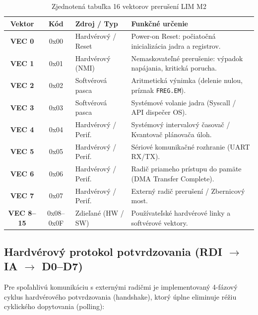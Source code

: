 \documentclass[11pt,a4paper]{article}
\newcommand{\reg}[1]{\texttt{#1}}
\begin{document}
\begin{table}[h]
\centering
\caption{Zjednotená tabuľka 16 vektorov prerušení LIM M2}
\label{tab:vectors}
\begin{tabularx}{\textwidth}{>{\bfseries}c >{\ttfamily}c p{32mm}X}
\toprule
Vektor & Kód & Zdroj / Typ & Funkčné určenie \\
\midrule
VEC 0  & 0x00 & Hardvérový / Reset  & Power-on Reset: počiatočná inicializácia jadra a registrov. \\
VEC 1  & 0x01 & Hardvérový (NMI)    & Nemaskovateľné prerušenie: výpadok napájania, kritická porucha. \\
VEC 2  & 0x02 & Softvérová pasca    & Aritmetická výnimka (delenie nulou, príznak \reg{FREG.EM}). \\
VEC 3  & 0x03 & Softvérová pasca    & Systémové volanie jadra (Syscall / API dispečer OS). \\
VEC 4  & 0x04 & Hardvérový / Perif. & Systémový intervalový časovač / Kvantovač plánovača úloh. \\
VEC 5  & 0x05 & Hardvérový / Perif. & Sériové komunikačné rozhranie (UART RX/TX). \\
VEC 6  & 0x06 & Hardvérový / Perif. & Radič priameho prístupu do pamäte (DMA Transfer Complete). \\
VEC 7  & 0x07 & Hardvérový / Perif. & Externý radič prerušení / Zbernicový most. \\
VEC 8--15 & 0x08--0x0F & Zdieľané (HW / SW) & Používateľské hardvérové linky a softvérové vektory. \\
\bottomrule
\end{tabularx}
\end{table}

\subsection{Hardvérový protokol potvrdzovania (RDI $\to$ IA $\to$ D0--D7)}
Pre spoľahlivú komunikáciu s externými radičmi je implementovaný 4-fázový cyklus hardvérového potvrdzovania (handshake), ktorý úplne eliminuje réžiu cyklického dopytovania (polling):
\end{document}
